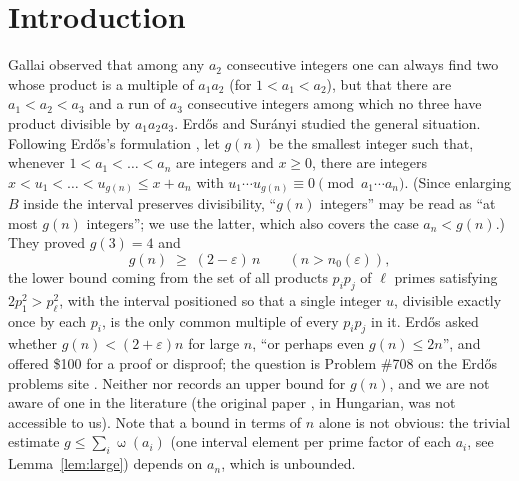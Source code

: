 \documentclass[11pt]{article}
\theoremstyle{definition}
\DeclareMathOperator{\om}{\omega}
\begin{document}
\begin{abstract}
Lean~4 and checked by the kernel: the final theorems depend only on the three standard axioms. We also show that the conjectured bound holds for long
intervals: if $a_n\ge 8n^3$ then $2n$ integers always suffice, so Erd\H{o}s's question is reduced to the
range $a_n<8n^3$; more generally, for every integer $k\ge 2$, $kn$ integers suffice whenever $a_n\le kn$ or
$a_n^{k-1}\ge(kn)^{k+1}$; hence for every fixed $\delta>0$ a bound linear in $n$ (with a constant depending on
$\delta$) holds whenever $a_n\ge n^{1+\delta}$, e.g.\ $12n$ integers suffice whenever $a_n\ge n^2$. All proofs are elementary and constructive: prime-power atoms of the $a_i$ that are large
relative to $a_n$ are placed one per interval element by a per-prime greedy rule, the small atoms are packed
into bins, and a counting argument bounds the number of bins. We also record $g(4)\ge 5$ and $g(5)\ge 6$ (and, in Section~\ref{sec:remains}, $g(10)\ge14$ and $g(12)\ge17$) by
exact computation.
\end{abstract}

\section{Introduction}

Gallai observed that among any $a_2$ consecutive integers one can always find two whose product is a
multiple of $a_1a_2$ (for $1<a_1<a_2$), but that there are $a_1<a_2<a_3$ and a run of $a_3$ consecutive
integers among which no three have product divisible by $a_1a_2a_3$. Erd\H{o}s and Sur\'anyi
\cite{ES59} studied the general situation. Following Erd\H{o}s's formulation \cite[\S1]{Er92}, let $g(n)$ be
the smallest integer such that, whenever $1<a_1<\dots<a_n$ are integers and $x\ge 0$, there are integers
$x<u_1<\dots<u_{g(n)}\le x+a_n$ with $u_1\cdots u_{g(n)}\equiv 0 \pmod{a_1\cdots a_n}$. (Since enlarging $B$ inside the interval preserves divisibility, ``$g(n)$ integers'' may be read as ``at most
$g(n)$ integers''; we use the latter, which also covers the case $a_n<g(n)$.) They proved
$g(3)=4$ and
\begin{equation}\label{eq:ES}
 g(n)\;\ge\;(2-\varepsilon)\,n\qquad(n>n_0(\varepsilon)),
\end{equation}
the lower bound coming from the set of all products $p_ip_j$ of $\ell$ primes satisfying $2p_1^2>p_\ell^2$,
with the interval positioned so that a single integer $u$, divisible exactly once by each $p_i$, is the only
common multiple of every $p_ip_j$ in it. Erd\H{o}s \cite{Er92} asked whether $g(n)<(2+\varepsilon)n$ for
large $n$, ``or perhaps even $g(n)\le 2n$'', and offered \$100 for a proof or disproof; the question is
Problem \#708 on the Erd\H{o}s problems site \cite{EP708}. Neither \cite{Er92} nor \cite{EP708} records
an upper bound for $g(n)$, and we are not aware of one in the literature (the original paper \cite{ES59},
in Hungarian, was not accessible to us). Note that a bound in terms of $n$ alone is not obvious: the trivial
estimate $g\le\sum_i\om(a_i)$ (one interval element per prime factor of each $a_i$, see
Lemma~\ref{lem:large}) depends on $a_n$, which is unbounded.
\end{document}
